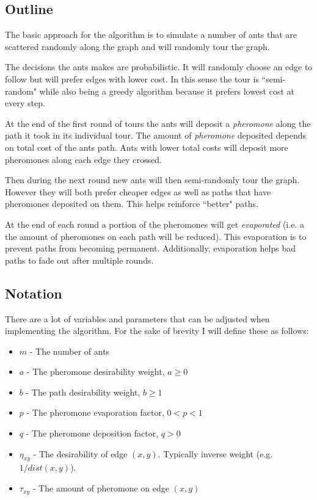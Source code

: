 \documentclass[twocolumn]{article}
\begin{document}
\subsection{Outline}
The basic approach for the algorithm is to simulate a number of ants that are scattered 
randomly along the graph and will randomly tour the graph. 

The decisions the ants makes are probabilistic. It will randomly choose an edge to follow but
will prefer edges with lower cost. In this sense the tour is ``semi-random" while also being a 
greedy algorithm because it prefers lowest cost at every step.

At the end of the first round of tours the ants will deposit a \textit{pheromone} along 
the path it took in its individual tour. The amount of \textit{pheromone} deposited depends on 
total cost of the ants path. Ants with lower total costs will deposit more pheromones
along each edge they crossed.

Then during the next round new ants will then semi-randomly tour the graph. However they will both
prefer cheaper edges as well as paths that have pheromones deposited on them. This helps reinforce 
``better" paths.

At the end of each round a portion of the pheromones will get \textit{evaporated} (i.e. a 
the amount of pheromones on each path will be reduced). This evaporation is to prevent paths from 
becoming permanent. Additionally, evaporation helps bad paths to fade out after multiple rounds.

\subsection{Notation}
There are a lot of variables and parameters that can be adjusted when implementing the algorithm.
For the sake of brevity I will define these as follows:
\begin{itemize}
    \item $m$ - The number of ants
    \item $a$ - The pheromone desirability weight, $a \ge 0$
    \item $b$ - The path desirability weight, $b \ge 1$
    \item $p$ - The pheromone evaporation factor, $0 < p < 1$
    \item $q$ - The pheromone deposition factor, $q > 0$
    \item $\eta_{xy}$ - The desirability of edge $(x,y)$. Typically inverse weight (e.g. $1/dist(x,y)$).
    \item $\tau_{xy}$ - The amount of pheromone on edge $(x,y)$
\end{itemize}
\end{document}
